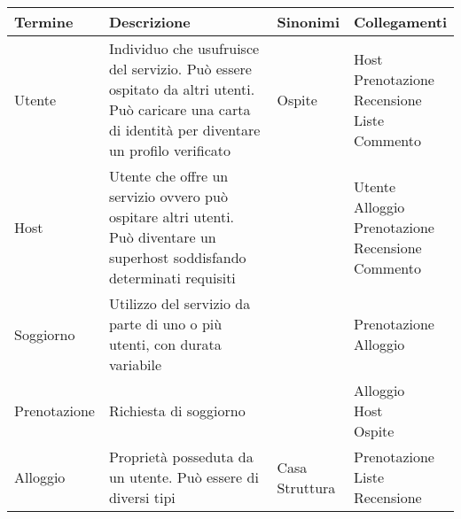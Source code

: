 \small
\setlength\extrarowheight{2pt}
\begin{tabular}{|l|p{4.95cm}|l|l|}
    \hline\bfseries Termine & \bfseries Descrizione                                                                                                                              & \bfseries Sinonimi                 & \bfseries Collegamenti                                              \\\hline
    Utente                  & Individuo che usufruisce del servizio. Può essere ospitato da altri utenti. Può caricare una carta di identità per diventare un profilo verificato & {Ospite}                           & \makecell[tl]{Host\\Prenotazione\\Recensione\\Liste\\Commento}      \\\hline
    Host                    & Utente che offre un servizio ovvero può ospitare altri utenti. Può diventare un superhost soddisfando determinati requisiti                        &                                    & \makecell[tl]{Utente\\Alloggio\\Prenotazione\\Recensione\\Commento} \\\hline
    Soggiorno               & {Utilizzo del servizio da parte di uno o più utenti, con durata variabile}                                                                         &                                    & \makecell[tl]{Prenotazione\\Alloggio}                               \\\hline
    Prenotazione            & Richiesta di soggiorno                                                                                                                             &                                    & \makecell[tl]{Alloggio\\Host\\Ospite}                               \\\hline
    Alloggio                & Proprietà posseduta da un utente. Può essere di diversi tipi                                                                                       & \makecell[tl]{Casa\\Struttura}     & \makecell[tl]{Prenotazione\\Liste\\Recensione}                      \\\hline

\end{tabular}
